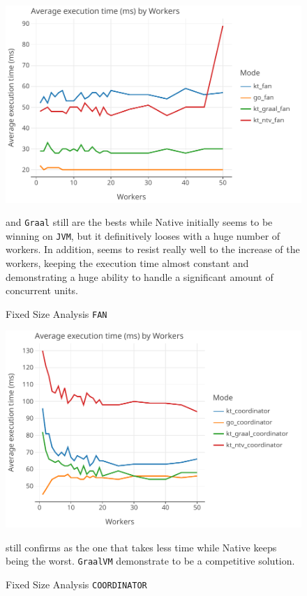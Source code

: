 \begin{figure}[H]
	\centering
	\begin{minipage}{0.7\textwidth}
		\centering
		\includegraphics[width=\textwidth]{img/graphs/fixed_size_fan}
		\caption{Fixed Size Analysis \texttt{FAN}}
	\end{minipage}\hfill
	\begin{minipage}{0.25\textwidth}
		\Go and \Kotlin \texttt{Graal} still are the bests while \Kotlin Native initially seems to be winning on \texttt{JVM}, but it definitively looses with a huge number of workers. In addition, \Go seems to resist really well to the increase of the workers, keeping the execution time almost constant and demonstrating a huge ability to handle a significant amount of concurrent units.
	\end{minipage}
\end{figure}

\begin{figure}[H]
	\centering
	\begin{minipage}{0.7\textwidth}
		\centering
		\includegraphics[width=\textwidth]{img/graphs/fixed_size_coordinator}
		\caption{Fixed Size Analysis  \texttt{COORDINATOR}}
	\end{minipage}\hfill
	\begin{minipage}{0.25\textwidth}
		\Go still confirms as the one that takes less time while \Kotlin Native keeps being the worst.
		\texttt{GraalVM} demonstrate to be a competitive solution.
	\end{minipage}
\end{figure}

